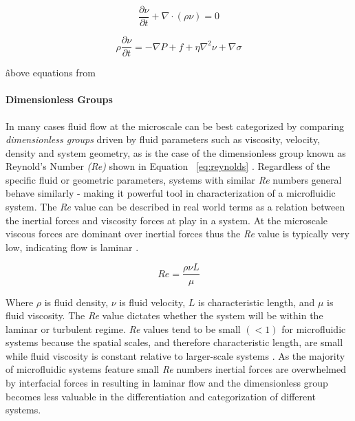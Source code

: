 \begin{equation}
\frac {\partial \nu}{\partial t} + \nabla \cdot  ( \rho \nu) = 0
\label{eq:navierCOM}
\end{equation}

\begin{equation}
\rho \frac {\partial \nu}{\partial t} = - \nabla P+ f +\eta \nabla^2 \nu + \nabla \sigma
\label{eq:navierCOM}
\end{equation}

\^ above equations from \cite{Shui2007}

\paragraph{Dimensionless Groups} In many cases fluid flow at the microscale can be best categorized by comparing \emph{dimensionless groups} driven by fluid parameters such as viscosity, velocity, density and system geometry, as is the case of the dimensionless group known as Reynold's Number \emph{(Re)} shown in Equation ~\vref{eq:reynolds} . Regardless of the specific fluid or geometric parameters, systems with similar \emph{Re}  numbers general behave similarly - making it  powerful tool in characterization of a microfluidic system. The \emph{Re} value can be described in real world terms as a relation between the inertial forces and viscosity forces at play in a system. At the microscale viscous forces are dominant over inertial forces thus the \emph{Re} value is typically very low, indicating flow is laminar \cite{Kleinstreuer2013}.

\begin{equation}
Re =\frac {\rho \nu L}{\mu}
\label{eq:reynolds}
\end{equation}

Where $\rho$ is fluid density, $\nu$ is fluid velocity, $L$ is characteristic length, and $\mu$ is fluid viscosity. The \emph{Re} value dictates whether the system will be within the laminar or turbulent regime. \emph{Re} values tend to be small $(< 1)$ for microfluidic systems because the spatial scales, and therefore characteristic length, are small while fluid viscosity is constant relative to larger-scale systems \cite{D??azNafr??a2013}. As the majority of microfluidic systems feature small \emph{Re} numbers inertial forces are overwhelmed by interfacial forces in resulting in laminar flow and the dimensionless group becomes less valuable in the differentiation and categorization of different systems\cite{Shui2007}.

